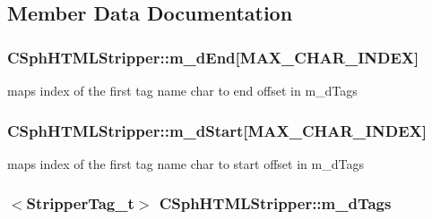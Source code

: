 \subsection{Member Data Documentation}
\hypertarget{classCSphHTMLStripper_af3293a9a7026540726a7ef9cce2a3c15}{
\subsubsection[{m\-\_\-d\-End}]{ C\-Sph\-H\-T\-M\-L\-Stripper\-::m\-\_\-d\-End\mbox{[}{\bf M\-A\-X\-\_\-\-C\-H\-A\-R\-\_\-\-I\-N\-D\-E\-X}\mbox{]}\hspace{0.3cm}{\ttfamily [protected]}}}\label{classCSphHTMLStripper_af3293a9a7026540726a7ef9cce2a3c15}


maps index of the first tag name char to end offset in m\-\_\-d\-Tags 

\hypertarget{classCSphHTMLStripper_a2022427fa6d9f73889a1444f59da8428}{
\subsubsection[{m\-\_\-d\-Start}]{ C\-Sph\-H\-T\-M\-L\-Stripper\-::m\-\_\-d\-Start\mbox{[}{\bf M\-A\-X\-\_\-\-C\-H\-A\-R\-\_\-\-I\-N\-D\-E\-X}\mbox{]}\hspace{0.3cm}{\ttfamily [protected]}}}\label{classCSphHTMLStripper_a2022427fa6d9f73889a1444f59da8428}


maps index of the first tag name char to start offset in m\-\_\-d\-Tags 

\hypertarget{classCSphHTMLStripper_a49a2ccd3e42cbc5799cb3026448813ab}{
\subsubsection[{m\-\_\-d\-Tags}]{$<${\bf Stripper\-Tag\-\_\-t}$>$ C\-Sph\-H\-T\-M\-L\-Stripper\-::m\-\_\-d\-Tags\hspace{0.3cm}{\ttfamily [protected]}}}\label{classCSphHTMLStripper_a49a2ccd3e42cbc5799cb3026448813ab}



